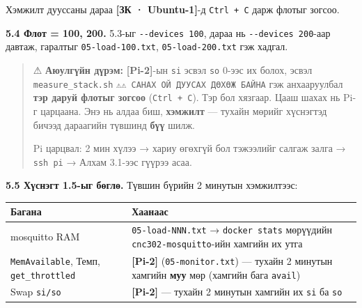 Хэмжилт дууссаны дараа \textbf{{[}ЗК · Ubuntu-1{]}}-д \texttt{Ctrl\ +\ C} дарж флотыг зогсоо.

\textbf{5.4 Флот = 100, 200.} 5.3-ыг \texttt{-\/-devices\ 100}, дараа нь \texttt{-\/-devices\ 200}-аар давтаж, гаралтыг \texttt{05-load-100.txt}, \texttt{05-load-200.txt} гэж хадгал.

\begin{quote}
⚠ \textbf{Аюулгүйн дүрэм:} \textbf{{[}Pi-2{]}}-ын \texttt{si} эсвэл \texttt{so} 0-ээс их болох, эсвэл \texttt{measure\_\allowbreak{}stack.\allowbreak{}sh} \texttt{⚠⚠\ САНАХ\ ОЙ\ ДУУСАХ\ ДӨХӨЖ\ БАЙНА} гэж анхааруулбал \textbf{тэр даруй флотыг зогсоо} (\texttt{Ctrl\ +\ C}). Тэр бол хязгаар. Цааш шахах нь Pi-г царцаана. Энэ нь алдаа биш, \textbf{хэмжилт} --- тухайн мөрийг хүснэгтэд бичээд дараагийн түвшинд \textbf{бүү} шилж.

Pi царцвал: 2 мин хүлээ → хариу өгөхгүй бол тэжээлийг салгаж залга → \texttt{ssh\ pi} → Алхам 3.1-ээс гүүрээ асаа.
\end{quote}

\textbf{5.5 Хүснэгт 1.5-ыг бөглө.} Түвшин бүрийн 2 минутын хэмжилтээс:

\begingroup\scriptsize\begin{longtable}[]{@{}ll@{}}
\toprule
\begin{minipage}[b]{0.47\columnwidth}\raggedright
Багана\strut
\end{minipage} & \begin{minipage}[b]{0.47\columnwidth}\raggedright
Хаанаас\strut
\end{minipage}\tabularnewline
\midrule
\endhead
\begin{minipage}[t]{0.47\columnwidth}\raggedright
mosquitto RAM\strut
\end{minipage} & \begin{minipage}[t]{0.47\columnwidth}\raggedright
\texttt{05-load-NNN.txt} → \texttt{docker\ stats} мөрүүдийн \texttt{cnc302-mosquitto}-ийн хамгийн их утга\strut
\end{minipage}\tabularnewline
\begin{minipage}[t]{0.47\columnwidth}\raggedright
\texttt{MemAvailable}, Темп, \texttt{get\_throttled}\strut
\end{minipage} & \begin{minipage}[t]{0.47\columnwidth}\raggedright
\textbf{{[}Pi-2{]}} (\texttt{05-monitor.txt}) --- тухайн 2 минутын хамгийн \textbf{муу} мөр (хамгийн бага \texttt{avail})\strut
\end{minipage}\tabularnewline
\begin{minipage}[t]{0.47\columnwidth}\raggedright
Swap \texttt{si/so}\strut
\end{minipage} & \begin{minipage}[t]{0.47\columnwidth}\raggedright
\textbf{{[}Pi-2{]}} --- тухайн 2 минутын хамгийн их \texttt{si} ба \texttt{so}\strut
\end{minipage}\tabularnewline
\bottomrule
\end{longtable}\endgroup

